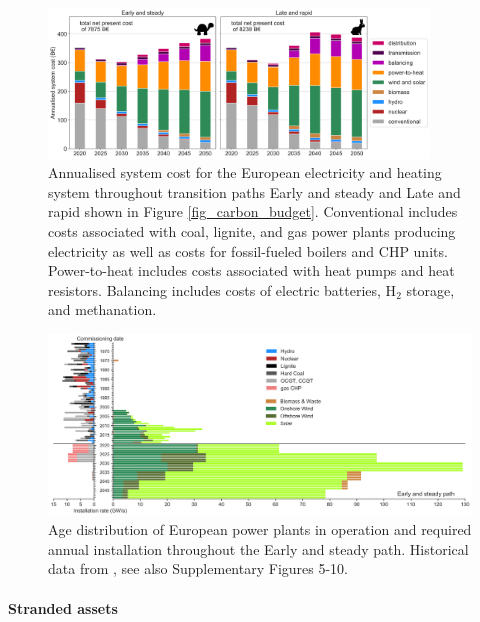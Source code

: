 \documentclass[5p]{elsarticle} %
\begin{document}
\begin{figure}[!h]
\centering
\includegraphics[width=0.9\textwidth]{../figures/System_cost_Base.png}
\caption{Annualised system cost for the European electricity and heating system throughout transition paths Early and steady and Late and rapid shown in Figure \ref{fig_carbon_budget}. Conventional includes costs associated with coal, lignite, and gas power plants producing electricity as well as costs for fossil-fueled boilers and CHP units. Power-to-heat includes costs associated with heat pumps and heat resistors. Balancing includes costs of electric batteries, H$_2$ storage, and methanation. } \label{fig_system_cost} 
\end{figure}

\begin{figure}[!h]
\centering
\includegraphics[width=\textwidth]{../figures/age_distribution_Base_Gentle.png}
\caption{Age distribution of European power plants in operation and required annual installation throughout the Early and steady path. Historical data from \cite{powerplantmatching, IRENA_2019}, see also Supplementary Figures 5-10.} \label{fig_age_distribution} 
\end{figure}

\paragraph{\textbf{Stranded assets}} \
\end{document}
